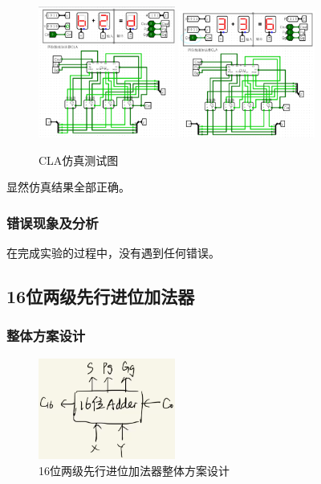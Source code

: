 \documentclass{article}
\begin{document}
    \begin{figure}[H]
    \centering
    \includegraphics[width=0.4\textwidth]{2.5.3.png}
    \includegraphics[width=0.4\textwidth]{2.5.4.png}
    \caption{CLA仿真测试图}
    \end{figure}

    显然仿真结果全部正确。

    \subsubsection{错误现象及分析}
    在完成实验的过程中，没有遇到任何错误。

    \subsection{16位两级先行进位加法器}

    \subsubsection{整体方案设计}
    \begin{figure}[H]
    \centering
    \includegraphics[width=0.4\textwidth]{3.1.png}
    \caption{16位两级先行进位加法器整体方案设计}
    \end{figure}
\end{document}
